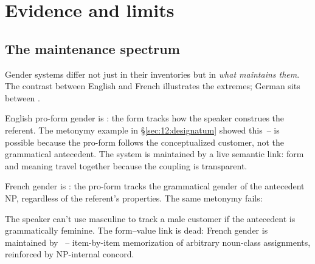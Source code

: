 \section{Evidence and limits}
\label{sec:12:evidence}

\subsection{The maintenance spectrum}
\label{sec:12:maintenance-spectrum}

Gender systems differ not just in their inventories but in \emph{what maintains them}. The contrast between English and French illustrates the extremes; German sits between \autocite{corbett1991,audring2009}.

English pro-form gender is : the form tracks how the speaker construes the referent. The metonymy example in §\ref{sec:12:designatum} showed this~--  is possible because the pro-form follows the conceptualized customer, not the grammatical antecedent. The system is maintained by a live semantic link: form and meaning travel together because the coupling is transparent.

French gender is : the pro-form tracks the grammatical gender of the antecedent NP, regardless of the referent's properties. The same metonymy fails:

\z

\noindent The speaker can't use masculine  to track a male customer if the antecedent  is grammatically feminine. The form--value link is dead: French gender is maintained by ~-- item-by-item memorization of arbitrary noun-class assignments, reinforced by NP-internal concord.

